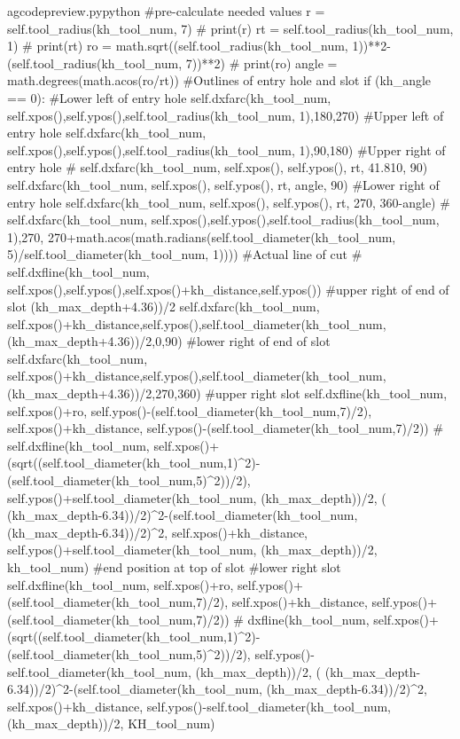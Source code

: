 \documentclass{ltxdoc}
\begin{document}
\lstset{firstnumber=\thegcpy}
\begin{writecode}{a}{gcodepreview.py}{python}
#pre-calculate needed values
        r = self.tool_radius(kh_tool_num, 7)
#        print(r)
        rt = self.tool_radius(kh_tool_num, 1)
#        print(rt)
        ro = math.sqrt((self.tool_radius(kh_tool_num, 1))**2-(self.tool_radius(kh_tool_num, 7))**2)
#        print(ro)
        angle = math.degrees(math.acos(ro/rt))
#Outlines of entry hole and slot
        if (kh_angle == 0):
#Lower left of entry hole
            self.dxfarc(kh_tool_num, self.xpos(),self.ypos(),self.tool_radius(kh_tool_num, 1),180,270)
#Upper left of entry hole
            self.dxfarc(kh_tool_num, self.xpos(),self.ypos(),self.tool_radius(kh_tool_num, 1),90,180)
#Upper right of entry hole
#            self.dxfarc(kh_tool_num, self.xpos(), self.ypos(), rt, 41.810, 90)
            self.dxfarc(kh_tool_num, self.xpos(), self.ypos(), rt, angle, 90)
#Lower right of entry hole
            self.dxfarc(kh_tool_num, self.xpos(), self.ypos(), rt, 270, 360-angle)
#            self.dxfarc(kh_tool_num, self.xpos(),self.ypos(),self.tool_radius(kh_tool_num, 1),270, 270+math.acos(math.radians(self.tool_diameter(kh_tool_num, 5)/self.tool_diameter(kh_tool_num, 1))))
#Actual line of cut
#            self.dxfline(kh_tool_num, self.xpos(),self.ypos(),self.xpos()+kh_distance,self.ypos())
#upper right of end of slot (kh_max_depth+4.36))/2
            self.dxfarc(kh_tool_num, self.xpos()+kh_distance,self.ypos(),self.tool_diameter(kh_tool_num, (kh_max_depth+4.36))/2,0,90)
#lower right of end of slot
            self.dxfarc(kh_tool_num, self.xpos()+kh_distance,self.ypos(),self.tool_diameter(kh_tool_num, (kh_max_depth+4.36))/2,270,360)
#upper right slot
            self.dxfline(kh_tool_num, self.xpos()+ro, self.ypos()-(self.tool_diameter(kh_tool_num,7)/2), self.xpos()+kh_distance, self.ypos()-(self.tool_diameter(kh_tool_num,7)/2))
#            self.dxfline(kh_tool_num, self.xpos()+(sqrt((self.tool_diameter(kh_tool_num,1)^2)-(self.tool_diameter(kh_tool_num,5)^2))/2), self.ypos()+self.tool_diameter(kh_tool_num, (kh_max_depth))/2, ( (kh_max_depth-6.34))/2)^2-(self.tool_diameter(kh_tool_num, (kh_max_depth-6.34))/2)^2, self.xpos()+kh_distance, self.ypos()+self.tool_diameter(kh_tool_num, (kh_max_depth))/2, kh_tool_num)
#end position at top of slot
#lower right slot
            self.dxfline(kh_tool_num, self.xpos()+ro, self.ypos()+(self.tool_diameter(kh_tool_num,7)/2), self.xpos()+kh_distance, self.ypos()+(self.tool_diameter(kh_tool_num,7)/2))
#        dxfline(kh_tool_num, self.xpos()+(sqrt((self.tool_diameter(kh_tool_num,1)^2)-(self.tool_diameter(kh_tool_num,5)^2))/2), self.ypos()-self.tool_diameter(kh_tool_num, (kh_max_depth))/2, ( (kh_max_depth-6.34))/2)^2-(self.tool_diameter(kh_tool_num, (kh_max_depth-6.34))/2)^2, self.xpos()+kh_distance, self.ypos()-self.tool_diameter(kh_tool_num, (kh_max_depth))/2, KH_tool_num)

\end{writecode}
\end{document}
